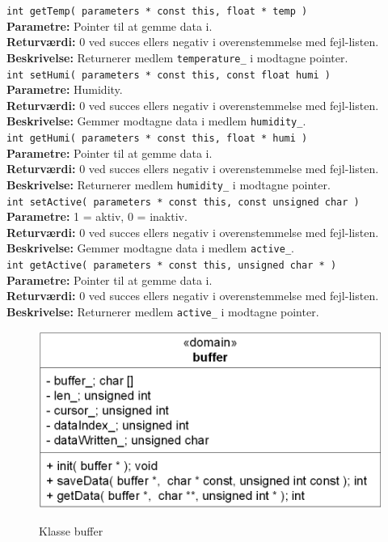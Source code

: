 \verb+int getTemp( parameters * const this, float * temp )+ \\
\textbf{Parametre:} Pointer til at gemme data i. \\
\textbf{Returværdi:} 0 ved succes ellers negativ i overenstemmelse med fejl-listen. \\
\textbf{Beskrivelse:} Returnerer medlem \verb+temperature_+ i modtagne pointer. \\

\verb+int setHumi( parameters * const this, const float humi )+ \\
\textbf{Parametre:} Humidity. \\
\textbf{Returværdi:} 0 ved succes ellers negativ i overenstemmelse med fejl-listen. \\
\textbf{Beskrivelse:} Gemmer modtagne data i medlem \verb+humidity_+. \\

\verb+int getHumi( parameters * const this, float * humi )+ \\
\textbf{Parametre:} Pointer til at gemme data i. \\
\textbf{Returværdi:} 0 ved succes ellers negativ i overenstemmelse med fejl-listen. \\
\textbf{Beskrivelse:} Returnerer medlem \verb+humidity_+ i modtagne pointer. \\

\verb+int setActive( parameters * const this, const unsigned char )+ \\
\textbf{Parametre:} 1 = aktiv, 0 = inaktiv. \\
\textbf{Returværdi:} 0 ved succes ellers negativ i overenstemmelse med fejl-listen. \\
\textbf{Beskrivelse:} Gemmer modtagne data i medlem \verb+active_+. \\

\verb+int getActive( parameters * const this, unsigned char * )+ \\
\textbf{Parametre:} Pointer til at gemme data i. \\
\textbf{Returværdi:} 0 ved succes ellers negativ i overenstemmelse med fejl-listen. \\
\textbf{Beskrivelse:} Returnerer medlem \verb+active_+ i modtagne pointer. \\


\begin{figure}[htbp] \centering
{\includegraphics[scale=1.3]{filer/design/Klassediagrammer/sw_psoc_buffer}}
\caption{Klasse buffer}
\label{fig:sw_psoc_class_buffer}
\end{figure} 

